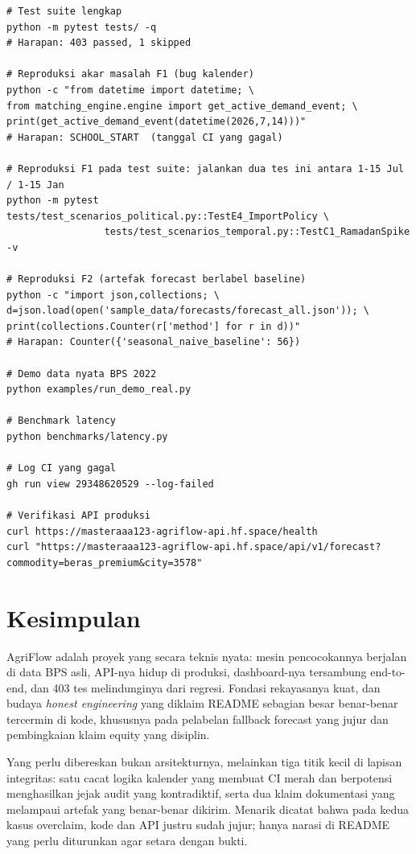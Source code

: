 \documentclass[11pt,a4paper]{article}
\begin{document}
\begin{lstlisting}
# Test suite lengkap
python -m pytest tests/ -q
# Harapan: 403 passed, 1 skipped

# Reproduksi akar masalah F1 (bug kalender)
python -c "from datetime import datetime; \
from matching_engine.engine import get_active_demand_event; \
print(get_active_demand_event(datetime(2026,7,14)))"
# Harapan: SCHOOL_START  (tanggal CI yang gagal)

# Reproduksi F1 pada test suite: jalankan dua tes ini antara 1-15 Jul / 1-15 Jan
python -m pytest tests/test_scenarios_political.py::TestE4_ImportPolicy \
                 tests/test_scenarios_temporal.py::TestC1_RamadanSpike -v

# Reproduksi F2 (artefak forecast berlabel baseline)
python -c "import json,collections; \
d=json.load(open('sample_data/forecasts/forecast_all.json')); \
print(collections.Counter(r['method'] for r in d))"
# Harapan: Counter({'seasonal_naive_baseline': 56})

# Demo data nyata BPS 2022
python examples/run_demo_real.py

# Benchmark latency
python benchmarks/latency.py

# Log CI yang gagal
gh run view 29348620529 --log-failed

# Verifikasi API produksi
curl https://masteraaa123-agriflow-api.hf.space/health
curl "https://masteraaa123-agriflow-api.hf.space/api/v1/forecast?commodity=beras_premium&city=3578"
\end{lstlisting}

\section{Kesimpulan}

AgriFlow adalah proyek yang secara teknis nyata: mesin pencocokannya berjalan di data BPS asli,
API-nya hidup di produksi, dashboard-nya tersambung end-to-end, dan 403 tes melindunginya dari
regresi. Fondasi rekayasanya kuat, dan budaya \emph{honest engineering} yang diklaim README
sebagian besar benar-benar tercermin di kode, khususnya pada pelabelan fallback forecast yang
jujur dan pembingkaian klaim equity yang disiplin.

Yang perlu dibereskan bukan arsitekturnya, melainkan tiga titik kecil di lapisan integritas: satu
cacat logika kalender yang membuat CI merah dan berpotensi menghasilkan jejak audit yang
kontradiktif, serta dua klaim dokumentasi yang melampaui artefak yang benar-benar dikirim. Menarik
dicatat bahwa pada kedua kasus overclaim, kode dan API justru sudah jujur; hanya narasi di README
yang perlu diturunkan agar setara dengan bukti.
\end{document}
